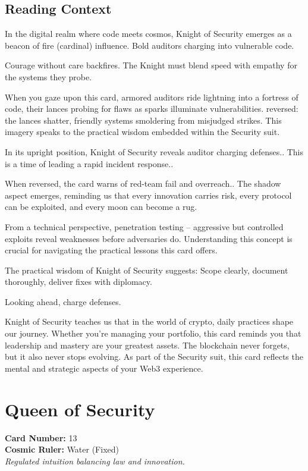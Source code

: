 \documentclass[11pt,oneside]{book}
\begin{document}
\begin{minipage}[t]{0.55\textwidth}
  \subsection*{Reading Context}
  In the digital realm where code meets cosmos, Knight of Security emerges as a beacon of fire (cardinal) influence. Bold auditors charging into vulnerable code.

  Courage without care backfires. The Knight must blend speed with empathy for the systems they probe.

  When you gaze upon this card, armored auditors ride lightning into a fortress of code, their lances probing for flaws as sparks illuminate vulnerabilities. reversed: the lances shatter, friendly systems smoldering from misjudged strikes. This imagery speaks to the practical wisdom embedded within the Security suit.

  In its upright position, Knight of Security reveals auditor charging defenses.. This is a time of leading a rapid incident response..

  When reversed, the card warns of red-team fail and overreach.. The shadow aspect emerges, reminding us that every innovation carries risk, every protocol can be exploited, and every moon can become a rug.

  From a technical perspective, penetration testing – aggressive but controlled exploits reveal weaknesses before adversaries do. Understanding this concept is crucial for navigating the practical lessons this card offers.

  The practical wisdom of Knight of Security suggests: Scope clearly, document thoroughly, deliver fixes with diplomacy.

  Looking ahead, charge defenses.

  Knight of Security teaches us that in the world of crypto, daily practices shape our journey. Whether you're managing your portfolio, this card reminds you that leadership and mastery are your greatest assets. The blockchain never forgets, but it also never stops evolving. As part of the Security suit, this card reflects the mental and strategic aspects of your Web3 experience.

\end{minipage}

\newpage
\section*{Queen of Security}

\begin{minipage}[t]{0.55\textwidth}
  \vspace{0pt}
  \textbf{Card Number:} 13\\  \textbf{Cosmic Ruler:} Water (Fixed)\\  \textit{Regulated intuition balancing law and innovation.}
\end{minipage}
\end{document}

